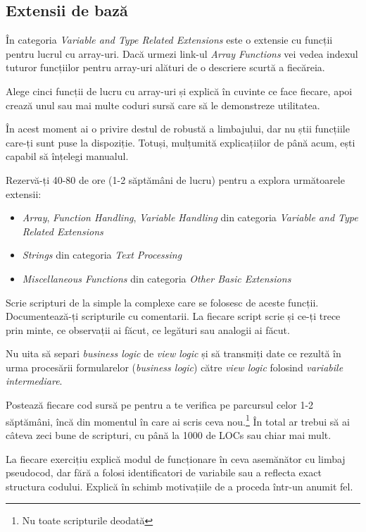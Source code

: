 \subsection{Extensii de bază}
În categoria \textit{Variable and Type Related Extensions}
este o extensie cu funcții pentru lucrul cu array-uri.
Dacă urmezi link-ul \textit{Array Functions} vei vedea
indexul tuturor funcțiilor pentru array-uri alături de
o descriere scurtă a fiecăreia.

\begin{Exercise}[title={Înțelege manualul}]
Alege cinci funcții de lucru cu array-uri și
explică în cuvinte ce face fiecare, apoi crează
unul sau mai multe coduri sursă care să le demonstreze
utilitatea.
\end{Exercise}
\begin{Exercise}[difficulty=3,title={Explorează manualul}]
În acest moment ai o privire destul de robustă a
limbajului, dar nu știi funcțiile care-ți sunt
puse la dispoziție. Totuși, mulțumită explicațiilor
de până acum, ești capabil să înțelegi manualul.

Rezervă-ți 40-80 de ore (1-2 săptămâni de lucru)
pentru a explora următoarele extensii:
\begin{itemize}
\item \textit{Array},
\textit{Function Handling}, \textit{Variable Handling} din categoria \textit{Variable and Type Related Extensions}
\item \textit{Strings} din categoria \textit{Text Processing}
\item \textit{Miscellaneous Functions} din categoria \textit{Other Basic Extensions}
\end{itemize}
Scrie scripturi de la simple la complexe care se folosesc
de aceste funcții. Documentează-ți scripturile cu comentarii.
La fiecare script scrie și ce-ți trece prin minte, ce observații
ai făcut, ce legături sau analogii ai făcut.

Nu uita să separi \textit{business logic} de \textit{view logic} și să transmiți date ce
rezultă în urma procesării formularelor (\textit{business logic}) către \textit{view logic}
folosind \textit{variabile intermediare}.

Postează fiecare cod sursă pe {\phpro} pentru a te verifica pe parcursul
celor 1-2 săptămâni, încă din momentul în care ai scris ceva nou.\footnote{Nu toate
scripturile deodată} În total ar trebui să ai câteva zeci bune de scripturi, cu
până la 1000 de LOCs sau chiar mai mult.

La fiecare exercițiu explică modul de funcționare \^in ceva asemănător cu
limbaj pseudocod, dar fără a folosi identificatori de variabile
sau a reflecta exact structura codului. Explică \^in schimb motivațiile
de a proceda \^intr-un anumit fel.


\end{Exercise}
